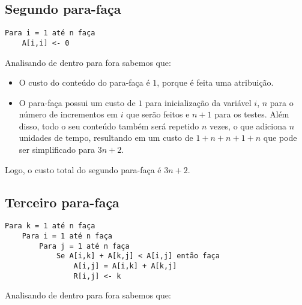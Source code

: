 \documentclass[a4paper,12pt]{article}
\begin{document}
\subsection*{Segundo para-faça}
\begin{verbatim}
Para i = 1 até n faça
    A[i,i] <- 0
\end{verbatim}

Analisando de dentro para fora sabemos que:

\begin{itemize}
    \item O custo do conteúdo do para-faça é $1$, porque é feita uma atribuição.
    
    \item O para-faça possui um custo de $1$ para inicialização da variável $i$, $n$ para o número de incrementos em $i$ que serão feitos e $n+1$ para os testes. Além disso, todo o seu conteúdo também será repetido $n$ vezes, o que adiciona $n$ unidades de tempo, resultando em um custo de $1 + n + n+1 + n$ que pode ser simplificado para $3n+2$.
\end{itemize}
Logo, o custo total do segundo para-faça é $3n+2$.

\newpage

\subsection*{Terceiro para-faça}
\begin{verbatim}
Para k = 1 até n faça
    Para i = 1 até n faça
        Para j = 1 até n faça
            Se A[i,k] + A[k,j] < A[i,j] então faça
                A[i,j] = A[i,k] + A[k,j]
                R[i,j] <- k
\end{verbatim}

Analisando de dentro para fora sabemos que:
\end{document}
